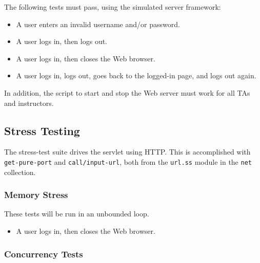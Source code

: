 \documentclass{article}
\begin{document}

The following tests must pass, using the simulated server framework:

\begin{itemize}
\item{A user enters an invalid username and/or password.}
\item{A user logs in, then logs out.}
\item{A user logs in, then closes the Web browser.}
\item{A user logs in, logs out, goes back to the logged-in page, and logs out
again.}
\end{itemize}

In addition, the script to start and stop the Web server must work for all TAs
and instructors.

\subsection{Stress Testing}\label{subsec:stresstests}

The stress-test suite drives the servlet using HTTP. This is accomplished with
\verb|get-pure-port| and \verb|call/input-url|, both from the \verb|url.ss|
module in the \verb|net| collection.

\subsubsection{Memory Stress}\label{subsubsec:mem-stress}

These tests will be run in an unbounded loop.

\begin{itemize}
\item{A user logs in, then closes the Web browser.}
\end{itemize}

\subsubsection{Concurrency Tests}\label{subsubsec:parrallel-stress}
\end{document}
